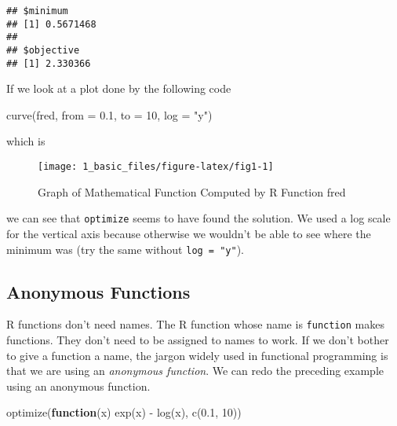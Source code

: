 \documentclass[
]{article}
\newenvironment{Shaded}{\begin{snugshade}}{\end{snugshade}}
\newcommand{\AttributeTok}[1]{\textcolor[rgb]{0.77,0.63,0.00}{#1}}
\newcommand{\ControlFlowTok}[1]{\textcolor[rgb]{0.13,0.29,0.53}{\textbf{#1}}}
\newcommand{\DecValTok}[1]{\textcolor[rgb]{0.00,0.00,0.81}{#1}}
\newcommand{\FloatTok}[1]{\textcolor[rgb]{0.00,0.00,0.81}{#1}}
\newcommand{\FunctionTok}[1]{\textcolor[rgb]{0.00,0.00,0.00}{#1}}
\newcommand{\NormalTok}[1]{#1}
\newcommand{\SpecialCharTok}[1]{\textcolor[rgb]{0.00,0.00,0.00}{#1}}
\newcommand{\StringTok}[1]{\textcolor[rgb]{0.31,0.60,0.02}{#1}}
\begin{document}
\begin{verbatim}
## $minimum
## [1] 0.5671468
## 
## $objective
## [1] 2.330366
\end{verbatim}

If we look at a plot done by the following code

\begin{Shaded}
\begin{Highlighting}[]
\FunctionTok{curve}\NormalTok{(fred, }\AttributeTok{from =} \FloatTok{0.1}\NormalTok{, }\AttributeTok{to =} \DecValTok{10}\NormalTok{, }\AttributeTok{log =} \StringTok{"y"}\NormalTok{)}
\end{Highlighting}
\end{Shaded}

which is

\begin{figure}

{\centering \texttt{[image: 1\_basic\_files/figure-latex/fig1-1]} 

}

\caption{Graph of Mathematical Function Computed by R Function fred}\label{fig:fig1}
\end{figure}

we can see that \texttt{optimize} seems to have found the solution. We
used a log scale for the vertical axis because otherwise we wouldn't be
able to see where the minimum was (try the same without
\texttt{log\ =\ "y"}).

\hypertarget{anonymous-functions}{%
\subsection{Anonymous Functions}\label{anonymous-functions}}

R functions don't need names. The R function whose name is
\texttt{function} makes functions. They don't need to be assigned to
names to work. If we don't bother to give a function a name, the jargon
widely used in functional programming is that we are using an
\emph{anonymous function}. We can redo the preceding example using an
anonymous function.

\begin{Shaded}
\begin{Highlighting}[]
\FunctionTok{optimize}\NormalTok{(}\ControlFlowTok{function}\NormalTok{(x) }\FunctionTok{exp}\NormalTok{(x) }\SpecialCharTok{{-}} \FunctionTok{log}\NormalTok{(x), }\FunctionTok{c}\NormalTok{(}\FloatTok{0.1}\NormalTok{, }\DecValTok{10}\NormalTok{))}
\end{Highlighting}
\end{Shaded}
\end{document}
